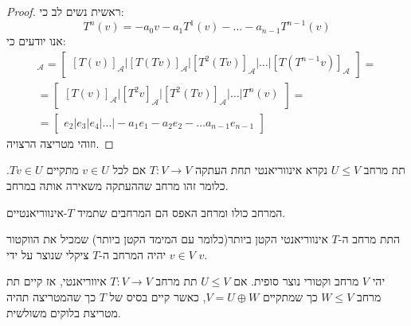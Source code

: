 \documentclass{tstextbook}
\begin{document}
\begin{proof}
ראשית נשים לב כי:
$$T^{n}(v)=-a_{0}v-a_{1}T^{1}(v)- \dots - a_{n-1}T^{n-1}(v)$$
אנו יודעים כי:
\begin{gather*}[T]_{\mathcal{A} }=\begin{bmatrix}[T(v)]_{\mathcal{A} } \bigg| [T(Tv)]_{\mathcal{A} } \bigg| [T^{2}(Tv)]_{\mathcal{A} }\bigg|\dots \bigg| [T(T^{n-1}v)]_{\mathcal{A} }\end{bmatrix}=  \\=\begin{bmatrix}[T(v)]_{\mathcal{A} } \bigg| [T^2 v]_{\mathcal{A} } \bigg| [T^{2}(Tv)]_{\mathcal{A} }\bigg|\dots \bigg| T^{n}(v)\end{bmatrix} =  \\= \begin{bmatrix}e_{2}\big| e_{3} \big| e_{4} \big| \dots \big| -a_{1}e_{1}-a_{2}e_{2}-\dots a_{n-1}e_{n-1}\end{bmatrix}
\end{gather*}
וזוהי מטריצה הרצויה.

\end{proof}
\begin{definition}
תת מרחב \(U\leq V\) נקרא אינווריאנטי תחת העתקה \(T:V\to V\) אם לכל \(v \in U\) מתקיים \(Tv \in U\). כלומר זהו מרחב שההעתקה משאירה אותה במרחב.

\end{definition}
\begin{remark}
המרחב כולו ומרחב האפס הם המרחבים שתמיד \(T\)-אינווריאנטיים.

\end{remark}
\begin{proposition}
התת מרחב ה-\(T\) אינווריאנטי הקטן ביותר(כלומר עם המימד הקטן ביותר) שמכיל את הווקטור \(v \in V\) יהיה המרחב ה-\(T\) ציקלי שנוצר על ידי \(v\).

\end{proposition}
\begin{proposition}
יהי \(V\) מרחב וקטורי נוצר סופית. אם \(U\leq V\) תת מרחב \(T:V\to V\) איווריאנטי, אז קיים תת מרחב \(W\leq V\) כך שמתקיים \(V=U \oplus W\), כאשר קיים בסיס של \(T\) כך שהמטריצה תהיה מטריצת בלוקים משולשית.

\end{proposition}
\end{document}
